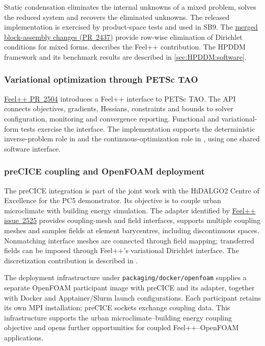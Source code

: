 Static condensation eliminates the internal unknowns of a mixed problem,
solves the reduced system and recovers the eliminated unknowns. The
released implementation is exercised by product-space tests and used in SB9.
The \href{https://github.com/feelpp/feelpp/pull/2437}{merged block-assembly changes (PR~2437)}
provide row-wise elimination of Dirichlet conditions for mixed forms.
 describes the Feel++
contribution. The HPDDM framework and its benchmark results are described
in \cref{sec:HPDDM:software}.

\subsubsection{Variational optimization through PETSc TAO}
\label{sec:Feelpp:implementation-2026:tao}
\href{https://github.com/feelpp/feelpp/pull/2504}{Feel++ PR~2504} introduces a Feel++ interface to PETSc TAO.
The API connects objectives, gradients, Hessians, constraints and bounds
to solver configuration, monitoring and convergence reporting.
Functional and variational-form tests exercise the interface.
The implementation supports the deterministic inverse-problem role in
 and the continuous-optimization role in
, using one shared software interface.

\subsubsection{preCICE coupling and OpenFOAM deployment}
\label{sec:Feelpp:implementation-2026:precice}
The preCICE integration is part of the joint work with the HiDALGO2
Centre of Excellence for the PC5 \KtirioUrbanBuildingContext{} demonstrator. Its
objective is to couple urban microclimate with building energy simulation.
The adapter identified by
\href{https://github.com/feelpp/feelpp/issues/2525}{Feel++ issue~2525}
provides coupling-mesh and field interfaces, supports multiple coupling
meshes and samples fields at element barycentres, including discontinuous
spaces. Nonmatching interface meshes are connected through field mapping;
transferred fields can be imposed through Feel++'s variational Dirichlet
interface. The discretization contribution is described in
.

The deployment infrastructure under \nolinkurl{packaging/docker/openfoam}
supplies a separate OpenFOAM participant image with preCICE and its adapter,
together with Docker and Apptainer/Slurm launch configurations. Each
participant retains its own MPI installation; preCICE sockets exchange
coupling data. This infrastructure supports the urban microclimate--building
energy coupling objective and opens further opportunities for coupled
Feel++--OpenFOAM applications.

